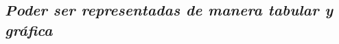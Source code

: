 \documentclass[
]{book}
\begin{document}
\hypertarget{poder-ser-representadas-de-manera-tabular-y-gruxe1fica}{%
\subsection{\texorpdfstring{\textbf{\emph{Poder ser representadas de manera tabular y gráfica}}}{Poder ser representadas de manera tabular y gráfica}}\label{poder-ser-representadas-de-manera-tabular-y-gruxe1fica}}

  
\end{document}
